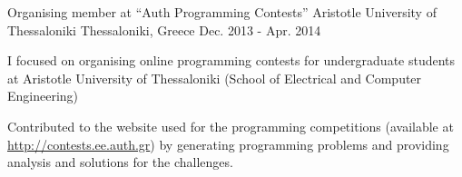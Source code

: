 \begin{cventries}
  \cventry
    {Organising member at ``Auth Programming Contests''} %
    {Aristotle University of Thessaloniki} %
    {Thessaloniki, Greece} %
    {Dec. 2013 - Apr. 2014} %
    {
      \begin{cvitems} %
        \item {I focused on organising online programming contests for undergraduate students at Aristotle University of Thessaloniki (School of Electrical and Computer Engineering)
        }
        \item {Contributed to the website used for the programming competitions (available at \url{http://contests.ee.auth.gr}) by generating programming problems and providing analysis and solutions for the challenges.}
      \end{cvitems}
    }

\end{cventries}
